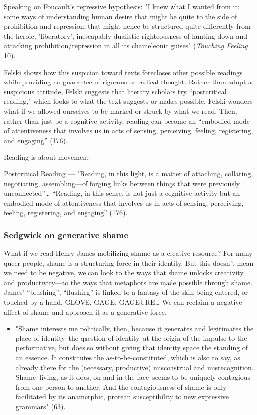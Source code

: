\documentclass[11pt]{article}
\begin{document}
Speaking on Foucault's repressive hypothesis: "I knew what I wanted
from it: some ways of understanding human desire that might be quite
to the side of prohibition and repression, that might hence be
structured quite differently from the heroic, 'liberatory',
inescapably dualistic righteousness of hunting down and attacking
prohibition/repression in all its chameleonic guises" (\emph{Touching
Feeling} 10).

Felski shows how this suspicion toward texts forecloses other possible
readings while providing no guarantee of rigorous or radical
thought. Rather than adopt a suspicious attitude, Felski suggests that
literary scholars try “postcritical reading," which looks to what the
text suggests or makes possible. Felski wonders what if we allowed
ourselves to be marked or struck by what we read. Then, rather than
just be a cognitive activity, reading can become an “embodied mode of
attentiveness that involves us in acts of sensing, perceiving,
feeling, registering, and engaging” (176).

Reading is about movement 


Postcritical Reading --- "Reading, in this light, is a matter of
attaching, collating, negotiating, assembling—of forging links between
things that were previously unconnected”… “Reading, in this sense, is
not just a cognitive activity but an embodied mode of attentiveness
that involves us in acts of sensing, perceiving, feeling, registering,
and engaging” (176).

\subsubsection{Sedgwick on generative shame}
\label{sec:orge84f7f9}
What if we read Henry James mobilizing shame as a creative resource?
  For many queer people, shame is a structuring force in their
  identity. But this doesn’t mean we need to be negative, we can look
  to the ways that shame unlocks creativity and productivity---to the
  ways that metaphors are made possible through shame. James’
  “blushing”, “flushing” is linked to a fantasy of the skin being
  entered, or touched by a hand. GLOVE, GAGE, GAGEURE…  We can reclaim
  a negative affect of shame and approach it as a generative force.
\begin{itemize}
\item "Shame interests me politically, then, because it generates and
legitimates the place of identity--the question of identity--at the
origin of the impulse to the performative, but does so without
giving that identity space the standing of an essence. It
constitutes the as-to-be-constituted, which is also to say, as
already there for the (necessary, productive) misconstrual and
misrecognition. Shame--living, as it does, on and in the face--seems
to be uniquely contagious from one person to another. And the
contagiousness of shame is only facilitated by its anamorphic,
protean susceptibility to new expressive grammars" (63).
\end{itemize}
\end{document}
